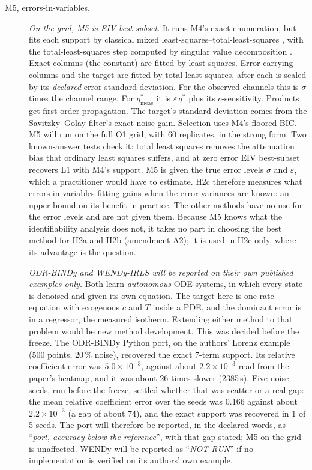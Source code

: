\documentclass[11pt]{article}
\newcommand{\qs}{q^{*}}
\newcommand{\qsm}{q^{*}_{\mathrm{meas}}}
\newcommand{\verdict}[1]{``\textit{#1}''}
\begin{document}
\begin{description}
\item[M5, errors-in-variables.] \emph{On the grid, M5 is EIV best-subset.} It runs M4's
exact enumeration, but fits each support by classical mixed least-squares--total-least-squares
\citep{golub1987}, with the total-least-squares step computed by singular value
decomposition \citep{golub1980}. Exact columns (the constant) are fitted by least squares.
Error-carrying columns and the target are fitted by total least squares, after each is
scaled by its \emph{declared} error standard deviation. For the observed channels this is
$\sigma$ times the channel range. For $\qsm$ it is $\varepsilon\,\qs$ plus its
$c$-sensitivity. Products get first-order propagation. The target's standard deviation
comes from the Savitzky--Golay filter's exact noise gain. Selection uses M4's floored BIC.
M5 will run on the full O1 grid, with 60 replicates, in the strong form. Two known-answer
tests check it: total least squares removes the attenuation bias that ordinary least
squares suffers, and at zero error EIV best-subset recovers L1 with M4's support.
M5 is given the true error levels $\sigma$ and $\varepsilon$, which a practitioner would have
to estimate. H2c therefore measures what errors-in-variables fitting gains when the error
variances are known: an upper bound on its benefit in practice. The other methods have no
use for the error levels and are not given them. Because M5 knows what the identifiability
analysis does not, it takes no part in choosing the best method for H2a and H2b
(amendment A2); it is used in H2c only, where its advantage is the question.

\emph{ODR-BINDy \citep{fung2026} and WENDy-IRLS \citep{bortz2023} will be reported on their
own published examples only.} Both learn \emph{autonomous} ODE systems, in which every
state is denoised and given its own equation. The target here is one rate equation with
exogenous $c$ and $T$ inside a PDE, and the dominant error is in a regressor, the measured
isotherm. Extending either method to that problem would be new method development. This
was decided before the freeze. The ODR-BINDy Python port, on the authors' Lorenz example
(500 points, 20\,\% noise), recovered the exact 7-term support. Its relative coefficient
error was $5.0\times10^{-3}$, against about $2.2\times10^{-3}$ read from the paper's
heatmap, and it was about 26 times slower (2385\,s). Five noise seeds, run before the
freeze, settled whether that was scatter or a real gap: the mean relative coefficient error
over the seeds was 0.166 against about $2.2\times10^{-3}$ (a gap of about 74), and the
exact support was recovered in 1 of 5 seeds. The port will therefore be reported, in the
declared words, as \verdict{port, accuracy below the reference}, with that gap stated; M5
on the grid is unaffected. WENDy will be reported as \verdict{NOT RUN} if no
implementation is verified on its authors' own example.


\end{description}
\end{document}
